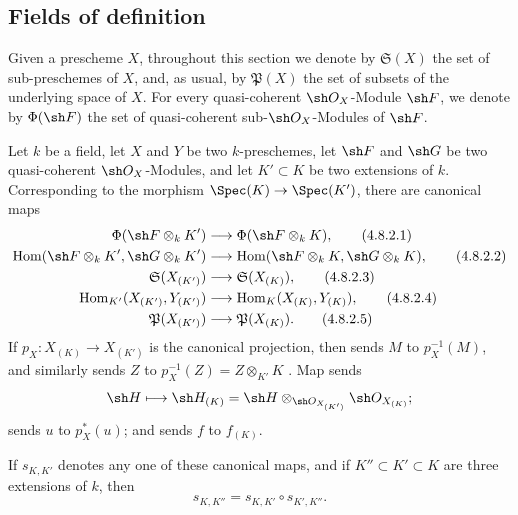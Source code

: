\subsection{Fields of definition}
\label{subsection:IV.4.8}

\begin{env}[4.8.1]
\label{IV.4.8.1}
Given a prescheme $X$, throughout this section we denote by
$\mathfrak S(X)$ the set of sub-preschemes of $X$, and, as usual, by
$\mathfrak P(X)$ the set of subsets of the underlying space of $X$.
For every quasi-coherent $\sh O_X$-Module $\sh F$, we denote by
$\Phi(\sh F)$ the set of quasi-coherent sub-$\sh O_X$-Modules of
$\sh F$.
\end{env}

\begin{env}[4.8.2]
\label{IV.4.8.2}
Let $k$ be a field, let $X$ and $Y$ be two $k$-preschemes, let
$\sh F$ and $\sh G$ be two quasi-coherent $\sh O_X$-Modules, and let
$K'\subset K$ be two extensions of $k$.
Corresponding to the morphism $\Spec(K)\to\Spec(K')$, there are
canonical maps
\begin{align}
\Phi(\sh F\otimes_kK')
  &\longrightarrow \Phi(\sh F\otimes_kK),
\tag{4.8.2.1}
\label{IV.4.8.2.1}\\
\operatorname{Hom}(\sh F\otimes_kK',\sh G\otimes_kK')
  &\longrightarrow
   \operatorname{Hom}(\sh F\otimes_kK,\sh G\otimes_kK),
\tag{4.8.2.2}
\label{IV.4.8.2.2}\\
\mathfrak S(X_{(K')})
  &\longrightarrow \mathfrak S(X_{(K)}),
\tag{4.8.2.3}
\label{IV.4.8.2.3}\\
\operatorname{Hom}_{K'}(X_{(K')},Y_{(K')})
  &\longrightarrow \operatorname{Hom}_{K}(X_{(K)},Y_{(K)}),
\tag{4.8.2.4}
\label{IV.4.8.2.4}\\
\mathfrak P(X_{(K')})
  &\longrightarrow \mathfrak P(X_{(K)}).
\tag{4.8.2.5}
\label{IV.4.8.2.5}
\end{align}
If $p_X:X_{(K)}\to X_{(K')}$ is the canonical projection, then
 sends $M$ to $p_X^{-1}(M)$, and similarly
 sends $Z$ to
$p_X^{-1}(Z)=Z\otimes_{K'}K$ .
Map  sends
\[
\sh H\longmapsto
\sh H_{(K)}
=
\sh H\otimes_{\sh O_{X_{(K')}}}\sh O_{X_{(K)}};
\]
 sends $u$ to $p_X^*(u)$; and
 sends $f$ to $f_{(K)}$.

If $s_{K,K'}$ denotes any one of these canonical maps, and if
$K''\subset K'\subset K$ are three extensions of $k$, then
\begin{equation}
s_{K,K''}=s_{K,K'}\circ s_{K',K''}.
\tag{4.8.2.6}
\label{IV.4.8.2.6}
\end{equation}
\end{env}

